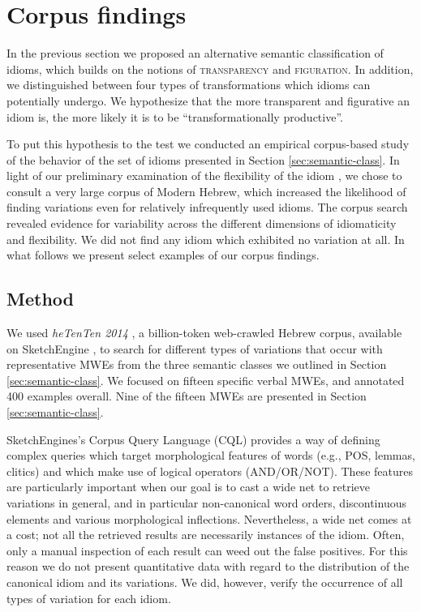 \documentclass[output=paper]{langsci/langscibook}
\begin{document}
\section{Corpus findings}
In the previous section we proposed an alternative semantic classification of idioms, which builds on the notions of {\scshape transparency} and {\scshape figuration}. In addition, we distinguished between four types of transformations which idioms can potentially undergo.
We hypothesize that the more transparent and figurative an idiom is, the more likely it is to be ``transformationally productive''.

To put this hypothesis to the test we conducted an empirical corpus-based study of the behavior of the set of idioms presented in Section \ref{sec:semantic-class}. In light of our preliminary examination of the flexibility of the idiom , we chose to consult a very large corpus of Modern Hebrew, which increased the likelihood of finding variations even for relatively infrequently used idioms. The corpus search revealed evidence for variability across the different dimensions of idiomaticity and flexibility. We did not find any idiom which exhibited no variation at all. In what follows we present select examples of our corpus findings.

\label{sec:findings}
\subsection{Method}
\label{sec:method}
We used \emph{heTenTen 2014} \citep{baroni-bernardini-ferraresi-zanchetta-2009}, a billion-token web-crawled Hebrew corpus, available on SketchEngine \citep{sketchengine}, to search for different types of variations that occur with representative MWEs from the three semantic classes we outlined in Section \ref{sec:semantic-class}. We focused on fifteen specific verbal MWEs, and annotated 400 examples overall. Nine of the fifteen MWEs are presented in Section \ref{sec:semantic-class}.

SketchEngines's Corpus Query Language (CQL) provides a way of defining complex queries which target morphological features of words (e.g., POS, lemmas, clitics) and which make
use of logical operators (AND/OR/NOT). These features are particularly important when our goal is to cast a wide net to retrieve variations in general, and in particular non-canonical word orders, discontinuous elements and various morphological inflections. Nevertheless, a wide net comes at a cost; not all the retrieved results are necessarily instances of the idiom. Often, only a manual inspection of each result can weed out the false positives. For this reason we do not present quantitative data with regard to the distribution of the canonical idiom and its variations. We did, however, verify the occurrence of all types of variation for each idiom.
\end{document}
